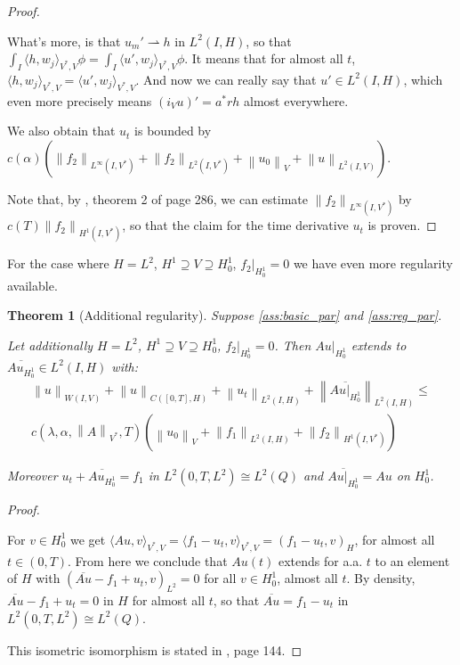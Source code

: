 \documentclass[english,a4paper,12pt,oneside]{scrbook}
\theoremstyle{break}
\newtheorem{thm}[equation]{Theorem}
\newenvironment{mproof}[1][\proofname]{%
  \begin{proof}[#1]$ $\par\nobreak\ignorespaces
}{%
  \end{proof}
}
\renewcommand*{\proofname}{Proof}
\theoremstyle{remark}
\newcommand{\norm}[1]{\left\lVert#1\right\rVert}
\newcommand{\VN}[1]{\norm{#1}_{V}}
\newcommand{\VSN}[1]{\norm{#1}_{V^*}}
\begin{document}
\begin{mproof}
What's more, is that $u_m' \rightharpoonup h$ in $L^2(I,H)$, so that $\int_I \langle h ,w_j\rangle_{V^*,V}\phi = \int_I \langle u',w_j\rangle_{V^*,V}\phi$. It means that for almost all $t$, $\langle h ,w_j\rangle_{V^*,V} = \langle u',w_j\rangle_{V^*,V}$. And now we can really say that $u' \in L^2(I,H)$, which even more precisely means $(i_Vu)' = a^* r h$ almost everywhere.

We also obtain that $u_t$ is bounded by $c(\alpha)(\norm{f_2}_{L^\infty(I,V^*)}+\norm{f_2}_{L^2(I,V^*)}+\VN{u_0}+\norm{u}_{L^2(I,V)})$.

Note that, by \cite{evans}, theorem 2 of page 286, we can estimate $\norm{f_2}_{L^\infty(I,V^*)}$ by $c(T)\norm{f_2}_{H^1(I,V^*)}$, so that the claim for the time derivative $u_t$ is proven.

\end{mproof}

For the case where $H=L^2$, $H^1\supseteq V\supseteq H^1_0$,  $f_2|_{H^1_0}=0$ we have even more regularity available.

\begin{thm}[Additional regularity]
\label{thm:par_reg}
Suppose \cref{ass:basic_par} and \cref{ass:reg_par}. 

Let additionally $H=L^2$, $H^1\supseteq V\supseteq H^1_0$,  $f_2|_{H^1_0}=0$. Then $Au|_{H^1_0}$ extends to $\overline{Au_{H^1_0}} \in L^2(I,H)$ with:
\begin{align}
	\norm{u}_{W(I,V)} + \norm{u}_{C([0,T],H)} + \norm{u_t}_{L^2(I,H)} +\norm{\overline{Au|_{H^1_0}}}_{L^2(I,H)}\leq\\ c(\lambda, \alpha, \VSN{A}, T)(\VN{u_0}+\norm{f_1}_{L^2(I,H)} + \norm{f_2}_{H^1(I,V^*)})
\end{align}

Moreover $u_t+\overline{Au_{H^1_0}}=f_1$ in $L^2(0,T,L^2)\cong L^2(Q)$ and $\overline{Au|_{H^1_0}}=Au$ on $H^1_0$.

\end{thm}
\begin{mproof}

For $v \in H^1_0$ we get $ \langle Au,v \rangle_{V^*,V} =  \langle f_1-u_t,v \rangle_{V^*,V} = ( f_1-u_t,v )_H$, for almost all $t \in (0,T)$. From here we conclude that $Au(t)$ extends for a.a. $t$ to an element of $H$ with $(\overline{Au}-f_1+u_t,v)_{L^2}=0$ for all $v \in H^1_0$, almost all $t$. By density, $\overline{Au}-f_1+u_t=0$ in $H$ for almost all $t$, so that $\overline{Au}=f_1-u_t$ in $L^2(0,T,L^2)\cong L^2(Q)$.

This isometric isomorphism is stated in \cite{trol}, page 144. 

\end{mproof}
\end{document}
